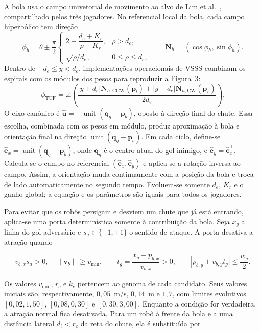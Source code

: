 \documentclass[12pt,a4paper]{article}
\newcommand{\vect}[1]{\boldsymbol{#1}}
\newcommand{\unit}[1]{\widehat{\vect{#1}}}
\begin{document}
A bola usa o campo univetorial de movimento ao alvo de Lim et al.\ \cite{lim2008},
compartilhado pelos tr\^es jogadores. No referencial local da bola, cada campo
hiperb\'olico tem dire\c{c}\~ao
\begin{equation}
 \phi_h=\theta\pm\frac{\pi}{2}
 \begin{cases}
  2-\dfrac{d_e+K_r}{\rho+K_r}, & \rho>d_e,\\
  \sqrt{\rho/d_e}, & 0\leq\rho\leq d_e,
 \end{cases}
 \qquad \vect{N}_h=(\cos\phi_h,\sin\phi_h).
\end{equation}
Dentro de $-d_e\leq y<d_e$, implementa\c{c}\~oes operacionais de VSSS combinam
os espirais com os m\'odulos dos pesos para reproduzir a Figura~3:
\begin{equation}
 \phi_{\mathrm{TUF}}=\angle\left(
 \frac{|y+d_e|\vect{N}_{h,\mathrm{CCW}}(\vect{p}_l)
 +|y-d_e|\vect{N}_{h,\mathrm{CW}}(\vect{p}_r)}{2d_e}\right).
\end{equation}
O eixo can\^onico \'e $\unit{u}=-\operatorname{unit}(\vect{q}_g-\vect{p}_b)$,
oposto à dire\c{c}\~ao final do chute. Essa escolha, combinada com os pesos em
m\'odulo, produz aproxima\c{c}\~ao à bola e orienta\c{c}\~ao final na dire\c{c}\~ao
$\operatorname{unit}(\vect{q}_g-\vect{p}_b)$.
Em cada ciclo, define-se $\unit{e}_x=\operatorname{unit}(\vect{q}_g-\vect{p}_b)$,
onde $\vect{q}_g$ \'e o centro atual do gol inimigo, e
$\unit{e}_y=\unit{e}_x^\perp$. Calcula-se o campo no referencial
$(\unit{e}_x,\unit{e}_y)$ e aplica-se a rota\c{c}\~ao inversa ao campo. Assim,
a orienta\c{c}\~ao muda continuamente com a posi\c{c}\~ao da bola e troca de lado
automaticamente no segundo tempo. Evoluem-se somente $d_e$, $K_r$ e o ganho
global; a equa\c{c}\~ao e os par\^ametros s\~ao iguais para todos os jogadores.

Para evitar que os rob\^os persigam e desviem um chute que j\'a est\'a entrando,
aplica-se uma porta determin\'istica somente \`a contribui\c{c}\~ao da bola. Seja
$x_g$ a linha do gol advers\'ario e $s_a\in\{-1,+1\}$ o sentido de ataque. A
porta desativa a atra\c{c}\~ao quando

\begin{equation}
  v_{b,x}s_a > 0, \quad \|\vect v_b\| \geq v_{\min}, \qquad
  t_g=\frac{x_g-p_{b,x}}{v_{b,x}}>0, \qquad
  \left|p_{b,y}+v_{b,y}t_g\right|\leq\frac{w_g}{2}.
\end{equation}

Os valores $v_{\min}$, $r_c$ e $k_c$ pertencem ao genoma de cada candidato. Seus
valores iniciais s\~ao, respectivamente, $0{,}05$~m/s, $0{,}14$~m e $1{,}7$, com
limites evolutivos $[0{,}02,1{,}50]$, $[0{,}08,0{,}30]$ e $[0{,}30,3{,}00]$.
Enquanto a condi\c{c}\~ao for verdadeira, a atra\c{c}\~ao normal fica desativada.
Para um rob\^o \`a frente da bola e a uma dist\^ancia lateral $d_\ell<r_c$ da
reta do chute, ela \'e substitu\'ida por
\end{document}
